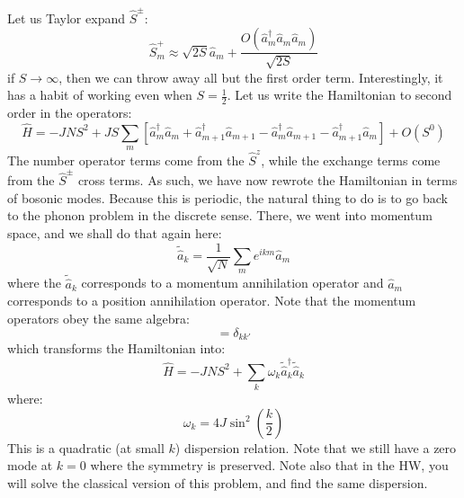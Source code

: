Let us Taylor expand $\hat{S}^\pm$:
\begin{equation}
    \hat{S}^+_m \approx \sqrt{2S}\hat{a}_m + \frac{O(\hat{a}_m^\dag \hat{a}_m \hat{a}_m)}{\sqrt{2S}}
\end{equation}
if $S \to \infty$, then we can throw away all but the first order term. Interestingly, it has a habit of working even when $S = \frac{1}{2}$. Let us write the Hamiltonian to second order in the operators:
\begin{equation}
    \hat{H} = -JNS^2 + JS\sum_m\left[\hat{a}^\dag_m\hat{a}_m + \hat{a}^\dag_{m+1}\hat{a}_{m+1} - \hat{a}^\dag_m \hat{a}_{m+1} - \hat{a}^\dag_{m+1}\hat{a}_m\right] + O(S^0)
\end{equation}
The number operator terms come from the $\hat{S}^z$, while the exchange terms come from the $\hat{S}^\pm$ cross terms. As such, we have now rewrote the Hamiltonian in terms of bosonic modes. Because this is periodic, the natural thing to do is to go back to the phonon problem in the discrete sense. There, we went into momentum space, and we shall do that again here:
\begin{equation}
    \tilde{\hat{a}}_k = \frac{1}{\sqrt{N}}\sum_m e^{ikm}\hat{a}_m
\end{equation}
where the $\tilde{\hat{a}}_k$ corresponds to a momentum annihilation operator and $\hat{a}_m$ corresponds to a position annihilation operator. Note that the momentum operators obey the same algebra:
\begin{equation}
    [\tilde{\hat{a}}_k, \tilde{hat{a}}^\dag_{k'}] = \delta_{kk'}
\end{equation}
which transforms the Hamiltonian into:
\begin{equation}
    \hat{H} = -JNS^2 + \sum_k \omega_k \tilde{\hat{a}}^\dag_k \tilde{\hat{a}}_k
\end{equation}
where:
\begin{equation}
    \omega_k = 4J\sin^2(\frac{k}{2})
\end{equation}
This is a quadratic (at small $k$) dispersion relation. Note that we still have a zero mode at $k = 0$ where the symmetry is preserved. Note also that in the HW, you will solve the classical version of this problem, and find the same dispersion.

